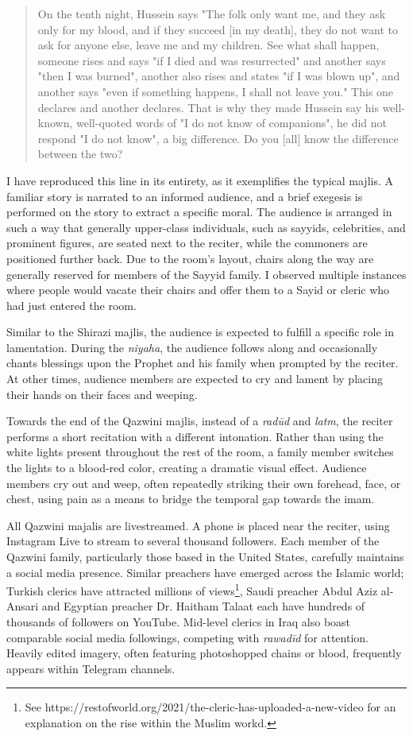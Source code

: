 \begin{quote}
On the tenth night, Hussein says "The folk only want me, and they ask only for my blood, and if they succeed [in my death], they do not want to ask for anyone else, leave me and my children. See what shall happen, someone rises and says "if I died and was resurrected" and another says "then I was burned", another also rises and states "if I was blown up", and another says "even if something happens, I shall not leave you." This one declares and another declares. That is why they made Hussein say his well-known, well-quoted words of "I do not know of companions", he did not respond "I do not know", a big difference. Do you [all] know the difference between the two?
\end{quote}

I have reproduced this line in its entirety, as it exemplifies the typical majlis. A familiar story is narrated to an informed audience, and a brief exegesis is performed on the story to extract a specific moral. The audience is arranged in such a way that generally upper-class individuals, such as sayyids, celebrities, and prominent figures, are seated next to the reciter, while the commoners are positioned further back. Due to the room's layout, chairs along the way are generally reserved for members of the Sayyid family. I observed multiple instances where people would vacate their chairs and offer them to a Sayid or cleric who had just entered the room.

Similar to the Shirazi majlis, the audience is expected to fulfill a specific role in lamentation. During the \emph{niyaha}, the audience follows along and occasionally chants blessings upon the Prophet and his family when prompted by the reciter. At other times, audience members are expected to cry and lament by placing their hands on their faces and weeping.

Towards the end of the Qazwini majlis, instead of a \emph{radūd} and \emph{latm}, the reciter performs a short recitation with a different intonation. Rather than using the white lights present throughout the rest of the room, a family member switches the lights to a blood-red color, creating a dramatic visual effect. Audience members cry out and weep, often repeatedly striking their own forehead, face, or chest, using pain as a means to bridge the temporal gap towards the imam.

All Qazwini majalis are livestreamed. A phone is placed near the reciter, using Instagram Live to stream to several thousand followers. Each member of the Qazwini family, particularly those based in the United States, carefully maintains a social media presence. Similar preachers have emerged across the Islamic world; Turkish clerics have attracted millions of views\footnote{See https://restofworld.org/2021/the-cleric-has-uploaded-a-new-video for an explanation on the rise within the Muslim workd.}, Saudi preacher Abdul Aziz al-Ansari and Egyptian preacher Dr. Haitham Talaat each have hundreds of thousands of followers on YouTube. Mid-level clerics in Iraq also boast comparable social media followings, competing with \emph{rawadīd} for attention. Heavily edited imagery, often featuring photoshopped chains or blood, frequently appears within Telegram channels.

